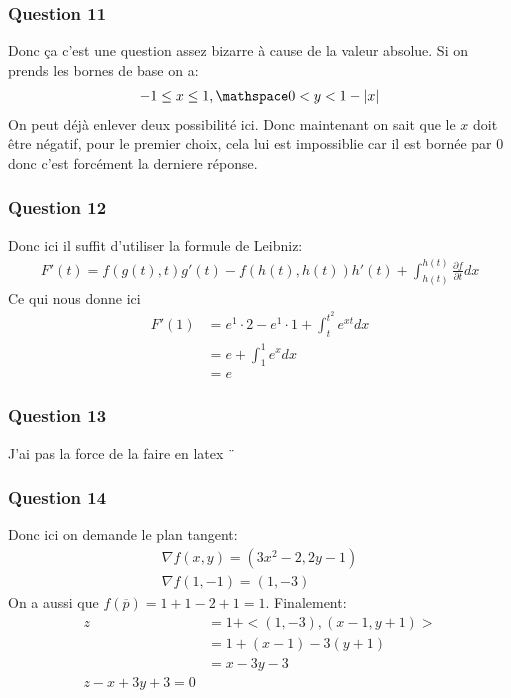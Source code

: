 \documentclass[a4paper]{article}
\begin{document}
\subsubsection{Question 11}
Donc ça c'est une question assez bizarre à cause de la valeur absolue. Si on prends les bornes de base on a:
\begin{align*} 
    -1 \leq x \leq 1, \mathspace 0 < y < 1 - \left|x\right|
\end{align*}
On peut déjà enlever deux possibilité ici. Donc maintenant on sait que le $x$ doit être négatif, pour le premier choix, cela lui est impossiblie car il est bornée par $0$ donc c'est forcément la derniere réponse.
\subsubsection{Question 12}
Donc ici il suffit d'utiliser la formule de Leibniz:
\begin{align*} 
    F'\left(t\right) = f\left(g\left(t\right), t\right)g'\left(t\right) - f\left(h\left(t\right), h\left(t\right)\right)h'\left(t\right) + \int_{h\left(t\right)}^{h\left(t\right)} \frac{\partial f}{\partial t} dx
\end{align*}
Ce qui nous donne ici
\begin{align*} 
    F'\left(1\right) &= e^{1}\cdot 2 - e^1 \cdot  1 + \int_{t}^{t^2} e^{xt}dx\\
                     &= e + \int_{1}^{1} e^{x} dx\\
                    &= e
\end{align*}




\subsubsection{Question 13}
    J'ai pas la force de la faire en latex ¨


\subsubsection{Question 14}
Donc ici on demande le plan tangent:
\begin{align*} 
    \nabla f \left(x, y\right) =  \left(3x^2 - 2, 2y - 1\right)\\
    \nabla f \left(1, -1\right) =  \left(1, -3\right)
\end{align*}
On a aussi que $f\left(\overline{p}\right) = 1 + 1 -2 + 1 = 1$. Finalement:
\begin{align*} 
    z &= 1 + < \left(1, -3\right), \left(x-1, y + 1\right) >\\
    &= 1 + \left(x-1\right) -3\left(y + 1\right)\\
    &=  x -3y -3\\
    z - x + 3y + 3 = 0
\end{align*}
\end{document}
